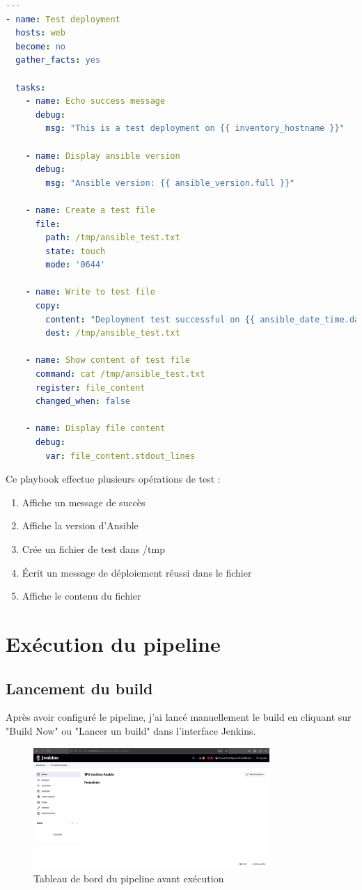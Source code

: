 \documentclass{article}
\begin{document}
\begin{lstlisting}[language=yaml]
---
- name: Test deployment 
  hosts: web
  become: no
  gather_facts: yes
  
  tasks:
    - name: Echo success message
      debug:
        msg: "This is a test deployment on {{ inventory_hostname }}"

    - name: Display ansible version
      debug:
        msg: "Ansible version: {{ ansible_version.full }}"

    - name: Create a test file
      file:
        path: /tmp/ansible_test.txt
        state: touch
        mode: '0644'

    - name: Write to test file
      copy:
        content: "Deployment test successful on {{ ansible_date_time.date }} at {{ ansible_date_time.time }}"
        dest: /tmp/ansible_test.txt

    - name: Show content of test file
      command: cat /tmp/ansible_test.txt
      register: file_content
      changed_when: false

    - name: Display file content
      debug:
        var: file_content.stdout_lines
\end{lstlisting}

Ce playbook effectue plusieurs opérations de test :
\begin{enumerate}
    \item Affiche un message de succès
    \item Affiche la version d'Ansible
    \item Crée un fichier de test dans /tmp
    \item Écrit un message de déploiement réussi dans le fichier
    \item Affiche le contenu du fichier
\end{enumerate}

\section{Exécution du pipeline}
\subsection{Lancement du build}

Après avoir configuré le pipeline, j'ai lancé manuellement le build en cliquant sur "Build Now" ou "Lancer un build" dans l'interface Jenkins.

\begin{figure}[h]
    \centering
    \includegraphics[width=0.8\textwidth]{images/jenkins_pipeline_dashboard.png}
    \caption{Tableau de bord du pipeline avant exécution}
    \label{fig:jenkins_pipeline_dashboard}
\end{figure}
\end{document}

